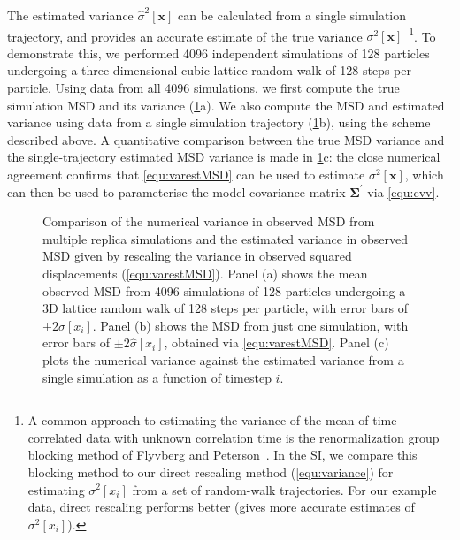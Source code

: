 \documentclass[reprint,superscriptaddress,nobibnotes,amsmath,amssymb,aps,prx,hidelinks]{revtex4-2}
\newcommand{\oMSD}{\ensuremath{\bm{x}}}
\newcommand{\oMSDi}{\ensuremath{x_i}}
\newcommand{\var}[1]{\ensuremath{\sigma^2[#1]}}
\newcommand{\varest}[1]{\ensuremath{\widehat{\sigma}^2[#1]}}
\begin{document}
The estimated variance $\varest{\oMSD}$ can be calculated from a single simulation trajectory, and provides an accurate estimate of the true variance $\var{\oMSD}$~\footnote{A common approach to estimating the variance of the mean of time-correlated data with unknown correlation time is the renormalization group blocking method of Flyvberg and Peterson~\cite{FlyvbjergAndPetersen_JChemPhys1989,Frenkel2023-ah}. In the SI, we compare this blocking method to our direct rescaling method (\cref{equ:variance}) for estimating $\var{\oMSDi}$ from a set of random-walk trajectories. For our example data, direct rescaling performs better (gives more accurate estimates of $\var{\oMSDi}$).}.
To demonstrate this, we performed \num{4096} independent simulations of \num{128} particles undergoing a three-dimensional cubic-lattice random walk of \num{128} steps per particle.
Using data from all \num{4096} simulations, we first compute the true simulation MSD and its variance (\cref{fig:msd}a).
We also compute the MSD and estimated variance using data from a single simulation trajectory (\cref{fig:msd}b), using the scheme described above.
A quantitative comparison between the true MSD variance and the single-trajectory estimated MSD variance is made in \cref{fig:msd}c: the close numerical agreement confirms that \cref{equ:varestMSD} can be used to estimate $\var{\oMSD}$, which can then be used to parameterise the model covariance matrix $\mathbf{\Sigma^\prime}$ via \cref{equ:cvv}.
\begin{figure}
    \centering
    \caption{
        Comparison of the numerical variance in observed MSD from multiple replica simulations and the estimated variance in observed MSD given by rescaling the variance in observed squared displacements (\cref{equ:varestMSD}).
        Panel (a) shows the mean observed MSD from \num{4096} simulations of \num{128} particles undergoing a 3D lattice random walk of \num{128} steps per particle, with error bars of $\pm2\sigma[\oMSDi]$.
        Panel (b) shows the MSD from just one simulation, with error bars of $\pm2\widehat{\sigma}[\oMSDi]$, obtained via \cref{equ:varestMSD}.
        Panel (c) plots the numerical variance against the estimated variance from a single simulation as a function of timestep $i$.
    }
    \label{fig:msd}
\end{figure}
\end{document}
